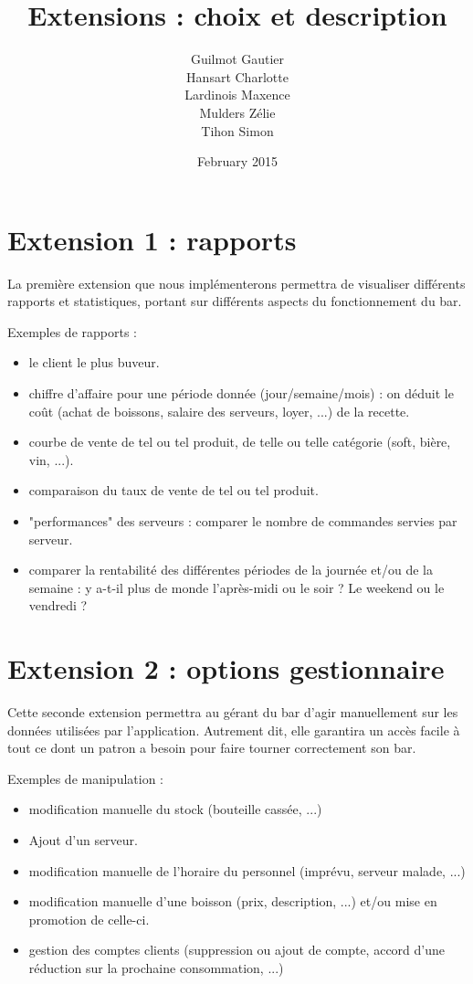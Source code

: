 \documentclass{article}
\title{Extensions : choix et description}
\author{Guilmot Gautier \\ Hansart Charlotte \\ Lardinois Maxence \\ Mulders Zélie \\ Tihon Simon  }
\date{February 2015}
\begin{document}
\maketitle

\section{Extension 1 : rapports}
La première extension que nous implémenterons permettra de visualiser différents rapports et statistiques, portant sur différents aspects du fonctionnement du bar.

Exemples de rapports : 
\begin{itemize}
\item le client le plus buveur.
\item chiffre d'affaire pour une période donnée (jour/semaine/mois) : on déduit le coût (achat de boissons, salaire des serveurs, loyer, ...) de la recette.
\item courbe de vente de tel ou tel produit, de telle ou telle catégorie (soft, bière, vin, ...).
\item comparaison du taux de vente de tel ou tel produit.
\item "performances" des serveurs : comparer le nombre de commandes servies par serveur.
\item comparer la rentabilité des différentes périodes de la journée et/ou de la semaine : y a-t-il plus de monde l'après-midi ou le soir ? Le weekend ou le vendredi ? 
\end{itemize} 
\section{Extension 2 : options gestionnaire}
Cette seconde extension permettra au gérant du bar d'agir manuellement sur les données utilisées par l'application. Autrement dit, elle garantira un accès facile à tout ce dont un patron a besoin pour faire tourner correctement son bar.

Exemples de manipulation : 
\begin{itemize}
\item modification manuelle du stock (bouteille cassée, ...)
\item Ajout d'un serveur.
\item modification manuelle de l'horaire du personnel (imprévu, serveur malade, ...)
\item modification manuelle d'une boisson (prix, description, ...) et/ou mise en promotion de celle-ci.
\item gestion des comptes clients (suppression ou ajout de compte, accord d'une réduction sur la prochaine consommation, ...)
\end{itemize}
\end{document}
